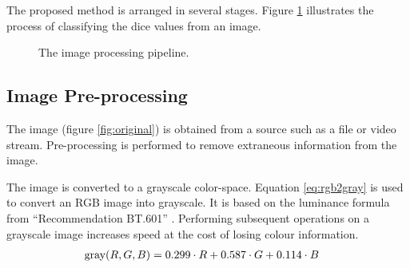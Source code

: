 \documentclass[conference]{IEEEtran}
\begin{document}
The proposed method is arranged in several stages.
Figure \ref{fig:stages} illustrates the process of classifying the dice values from an image. 
\begin{figure}
	\centering
	\caption{The image processing pipeline.}
	\label{fig:stages}
\end{figure}

\subsection{Image Pre-processing}

The image (figure \ref{fig:original}) is obtained from a source such as a file or video stream.
Pre-processing is performed to remove extraneous information from the image.

The image is converted to a grayscale color-space.
Equation \ref{eq:rgb2gray} is used to convert an RGB image into grayscale.
It is based on the luminance formula from ``Recommendation BT.601'' \cite{R2011}.
Performing subsequent operations on a grayscale image increases speed at the cost of losing colour information.
\begin{align}
	\textnormal{gray}(R, G, B) &= 0.299 \cdot R + 0.587 \cdot G + 0.114 \cdot B \label{eq:rgb2gray}
\end{align}
\end{document}
